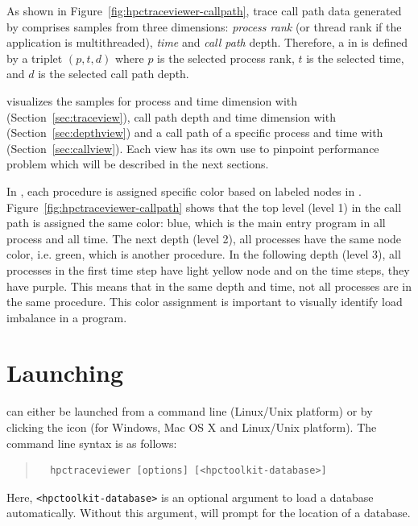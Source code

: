 As shown in Figure~\ref{fig:hpctraceviewer-callpath}, trace call path data generated by \hpcprof{} comprises samples from three dimensions: \emph{process rank} (or thread rank if the application is multithreaded), \emph{time} and \emph{call path} depth.
Therefore, a \emph{\crosshair} in \hpctraceviewer{} is defined by a triplet $(p,t,d)$ where $p$ is the selected process rank, $t$ is the selected time, and $d$ is the selected call path depth. 

\hpctraceviewer{} visualizes the samples for process and time dimension with \emph{\traceview} (Section~\ref{sec:traceview}), call path depth and time dimension with \emph{\depthview} (Section~\ref{sec:depthview}) and a call path of a specific process and time with \emph{\callview} (Section~\ref{sec:callview}).
Each view has its own use to pinpoint performance problem which will be described in the next sections.

In \hpctraceviewer, each procedure is assigned specific color based on labeled nodes in \hpcviewer. Figure~\ref{fig:hpctraceviewer-callpath} shows that the top level (level 1) in the call path is assigned the same color: blue, which is the main entry program in all process and all time.
The next depth (level 2), all processes have the same node color, i.e. green, which is another procedure. 
In the following depth (level 3), all processes in the first time step have light yellow node and on the time steps, they have purple. This means that in the same depth and time, not all processes are in the same procedure.
This color assignment is important to visually identify load imbalance in a program.


\section{Launching}

\hpctraceviewer{} can either be launched from a command line (Linux/Unix platform) or by clicking the \hpctraceviewer{} icon (for Windows, Mac OS X and Linux/Unix platform).
The command line syntax is as follows:
\begin{quote}
\begin{verbatim}
  hpctraceviewer [options] [<hpctoolkit-database>]
\end{verbatim}
\end{quote}
Here, \texttt{<hpctoolkit-database>} is an optional argument to load a database automatically.
Without this argument, \hpctraceviewer{} will prompt for the location of a database.

